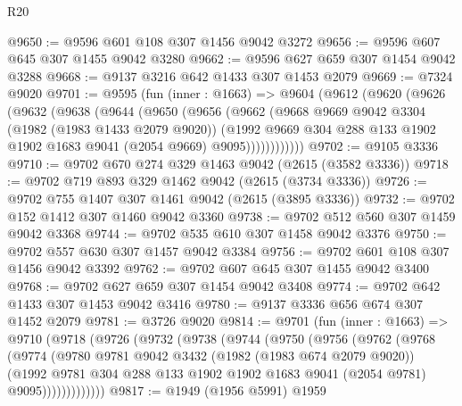 \begin{lexlean}{R20}
\begin{coremodule}
@9650 := @9596 @601 @108 @307 @1456 @9042 @3272
@9656 := @9596 @607 @645 @307 @1455 @9042 @3280
@9662 := @9596 @627 @659 @307 @1454 @9042 @3288
@9668 := @9137 @3216 @642 @1433 @307 @1453 @2079
@9669 := @7324 @9020
@9701 := @9595
    (fun (inner : @1663) =>
    @9604
      (@9612
        (@9620
          (@9626
            (@9632
              (@9638
                (@9644
                  (@9650
                    (@9656
                      (@9662
                        (@9668
                          @9669
                          @9042
                          @3304
                          (@1982 (@1983 @1433 @2079 @9020))
                          (@1992
                            @9669
                            @304
                            @288
                            @133
                            @1902
                            @1902
                            @1683
                            @9041
                            (@2054 @9669)
                            @9095))))))))))))
@9702 := @9105 @3336
@9710 := @9702 @670 @274 @329 @1463 @9042 (@2615 (@3582 @3336))
@9718 := @9702 @719 @893 @329 @1462 @9042 (@2615 (@3734 @3336))
@9726 := @9702 @755 @1407 @307 @1461 @9042 (@2615 (@3895 @3336))
@9732 := @9702 @152 @1412 @307 @1460 @9042 @3360
@9738 := @9702 @512 @560 @307 @1459 @9042 @3368
@9744 := @9702 @535 @610 @307 @1458 @9042 @3376
@9750 := @9702 @557 @630 @307 @1457 @9042 @3384
@9756 := @9702 @601 @108 @307 @1456 @9042 @3392
@9762 := @9702 @607 @645 @307 @1455 @9042 @3400
@9768 := @9702 @627 @659 @307 @1454 @9042 @3408
@9774 := @9702 @642 @1433 @307 @1453 @9042 @3416
@9780 := @9137 @3336 @656 @674 @307 @1452 @2079
@9781 := @3726 @9020
@9814 := @9701
    (fun (inner : @1663) =>
    @9710
      (@9718
        (@9726
          (@9732
            (@9738
              (@9744
                (@9750
                  (@9756
                    (@9762
                      (@9768
                        (@9774
                          (@9780
                            @9781
                            @9042
                            @3432
                            (@1982 (@1983 @674 @2079 @9020))
                            (@1992
                              @9781
                              @304
                              @288
                              @133
                              @1902
                              @1902
                              @1683
                              @9041
                              (@2054 @9781)
                              @9095)))))))))))))
@9817 := @1949 (@1956 @5991) @1959

\end{coremodule}
\end{lexlean}
